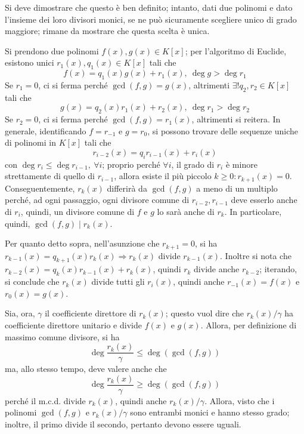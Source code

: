 \documentclass[11pt, a4paper]{scrartcl}
\theoremstyle{definition}
\numberwithin{esempio}{section}
\theoremstyle{definition}
\numberwithin{obs}{section}
\numberwithin{nota}{section}
\numberwithin{equation}{subsection}
\begin{document}
Si deve dimostrare che questo \`e ben definito; intanto, dati due polinomi e dato l'insieme dei loro divisori monici, se ne pu\`o sicuramente scegliere unico di grado maggiore; rimane da mostrare che questa scelta \`e unica.

Si prendono due polinomi $f(x),g(x) \in K[x]$; per l'algoritmo di Euclide, esistono unici $r_1(x),q_1(x) \in K[x]$ tali che
\[
f(x) = q_1(x) g(x) + r_1(x), \ \operatorname{deg} g > \operatorname{deg} r_1
\] 
Se $r_1=0$, ci si ferma perch\'e $\operatorname{gcd}(f,g) = g(x)$, altrimenti $\exists ! q_2,r_2\in K[x]$ tali che
\[
g(x) = q_2(x) r_1(x) + r_2(x), \ \operatorname{deg} r_1 > \operatorname{deg} r_2
\] 
Se $r_2=0$, ci si ferma perch\'e $\operatorname{gcd}(f,g) = r_1(x)$, altrimenti si reitera. 
In generale, identificando $f=r_{-1} $ e $g = r_0$, si possono trovare delle sequenze uniche di polinomi in $K[x]$ tali che
\[
r_{i-2} (x) = q_i r_{i-1} (x) + r_i(x) 
\] 
con $\operatorname{deg} r_{i} \le \operatorname{deg} r_{i-1}, \ \forall i$; proprio perch\'e $\forall i$, il grado di $r_i$ \`e minore strettamente di quello di $r_{i-1} $, allora esiste il pi\`u piccolo $k\ge 0: r_{k+1} (x) = 0$.
Conseguentemente, $r_k(x)$ differir\`a da $\operatorname{gcd}(f,g) $ a meno di un multiplo perch\'e, ad ogni passaggio, ogni divisore comune di $r_{i-2} , r_{i-1} $ deve esserlo anche di $r_i$, quindi, un divisore comune di $f$ e $g$ lo sar\`a anche di $r_k$.
In particolare, quindi, $\operatorname{gcd}(f,g)  \mid r_k(x)$.

Per quanto detto sopra, nell'asunzione che $r_{k+1} = 0$, si ha $r_{k-1} (x) = q_{k+1} (x) r_k(x)\Rightarrow r_k(x)$ divide $r_{k-1} (x)$. 
Inoltre si nota che $r_{k-2} (x) = q_k(x) r_{k-1} (x) + r_k(x)$, quindi $r_k$ divide anche $r_{k-2} $; iterando, si conclude che $r_k(x)$ divide tutti gli $r_i(x)$, quindi anche $r_{-1} (x) = f(x)$ e $r_0(x) = g(x)$.

Sia, ora, $\gamma$ il coefficiente direttore di $r_k(x)$; questo vuol dire che $r_k(x) / \gamma$ ha coefficiente direttore unitario e divide $f(x)$ e $g(x)$.
Allora, per definizione di massimo comune divisore, si ha 
\[
\operatorname{deg} \frac{r_k(x)}{\gamma} \le \operatorname{deg} \left(\operatorname{gcd}(f,g)\right)  
\] 
ma, allo stesso tempo, deve valere anche che
\[
\operatorname{deg} \frac{r_k(x)}{\gamma} \ge \operatorname{deg} \left(\operatorname{gcd}(f,g)\right)  
\] 
perch\'e il m.c.d. divide $r_k(x)$, quindi anche $r_k(x) / \gamma$.
Allora, visto che i polinomi $\operatorname{gcd}(f,g) $ e $r_k(x) / \gamma$ sono entrambi monici e hanno stesso grado; inoltre, il primo divide il secondo, pertanto devono essere uguali.
\end{document}
